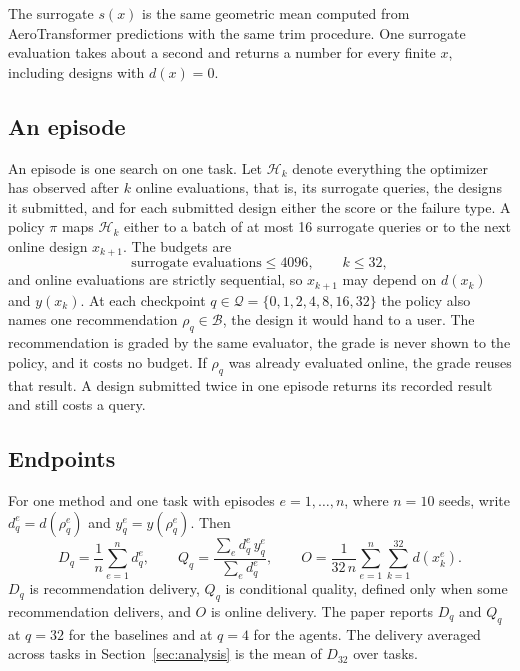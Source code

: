 The surrogate $s(x)$ is the same geometric mean computed from AeroTransformer
predictions with the same trim procedure. One surrogate evaluation takes about
a second and returns a number for every finite $x$, including designs with
$d(x) = 0$.

\subsection{An episode}

An episode is one search on one task. Let $\mathcal{H}_k$ denote everything the
optimizer has observed after $k$ online evaluations, that is, its surrogate
queries, the designs it submitted, and for each submitted design either the
score or the failure type. A policy $\pi$ maps $\mathcal{H}_k$ either to a
batch of at most 16 surrogate queries or to the next online design $x_{k+1}$.
The budgets are
\begin{equation}
\text{surrogate evaluations} \le 4096, \qquad k \le 32,
\label{eq:budgets}
\end{equation}
and online evaluations are strictly sequential, so $x_{k+1}$ may depend on
$d(x_k)$ and $y(x_k)$. At each checkpoint $q \in \mathcal{Q} = \{0, 1, 2, 4, 8,
16, 32\}$ the policy also names one recommendation $\rho_q \in \mathcal{B}$,
the design it would hand to a user. The recommendation is graded by the same
evaluator, the grade is never shown to the policy, and it costs no budget. If
$\rho_q$ was already evaluated online, the grade reuses that result. A design
submitted twice in one episode returns its recorded result and still costs a
query.

\subsection{Endpoints}

For one method and one task with episodes $e = 1, \dots, n$, where $n = 10$
seeds, write $d_q^{e} = d(\rho_q^{e})$ and $y_q^{e} = y(\rho_q^{e})$. Then
\begin{equation}
D_q = \frac{1}{n} \sum_{e=1}^{n} d_q^{e},
\qquad
Q_q = \frac{\sum_{e} d_q^{e}\, y_q^{e}}{\sum_{e} d_q^{e}},
\qquad
O = \frac{1}{32\, n} \sum_{e=1}^{n} \sum_{k=1}^{32} d(x_k^{e}).
\label{eq:endpoints}
\end{equation}
$D_q$ is recommendation delivery, $Q_q$ is conditional quality, defined only
when some recommendation delivers, and $O$ is online delivery. The paper
reports $D_q$ and $Q_q$ at $q = 32$ for the baselines and at $q = 4$ for the
agents. The delivery averaged across tasks in Section~\ref{sec:analysis} is the
mean of $D_{32}$ over tasks.

